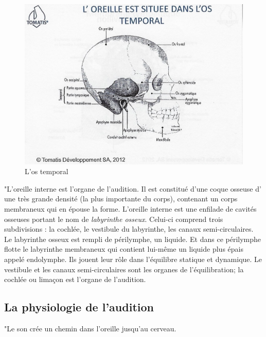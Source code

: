 \begin{figure}
	\centering
	\includegraphics[width=0.7\linewidth]{images/Loreilleostemporal_crane.jpg}
	\caption[L'os temporal]{L'os temporal}
	\label{fig:loreilleostemporal18}
\end{figure}
"L'oreille interne est l'organe de l'audition. Il
est constitué d'une coque osseuse d' une très grande densité (la plus
importante du corps), contenant un corps membraneux qui en épouse
la forme.
L'oreille interne est une enfilade de cavités osseuses portant
le nom de \emph{labyrinthe osseux}. Celui-ci comprend trois subdivisions :
la cochlée, le vestibule du labyrinthe, les canaux semi-circulaires.
Le labyrinthe
osseux est rempli de périlymphe, un liquide. Et dans ce périlymphe
flotte le labyrinthe membraneux qui contient lui-même un liquide
plus épais appelé endolymphe. Ils jouent leur rôle dans l'équilibre
statique et dynamique. Le vestibule et les canaux semi-circulaires
sont les organes de l'équilibration; la cochlée ou
limaçon est l'organe de l'audition.
\subsection {La physiologie de l'audition}

"Le  son crée un chemin dans
l'oreille \autocite[322--324]{marieb:biologie} jusqu'au cerveau.


